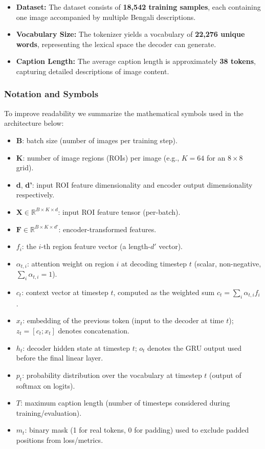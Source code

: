 \begin{itemize}
    \item \textbf{Dataset:} The dataset consists of \textbf{18,542 training samples}, each containing one image accompanied by multiple Bengali descriptions.

    \item \textbf{Vocabulary Size:} The tokenizer yields a vocabulary of \textbf{22,276 unique words}, representing the lexical space the decoder can generate.

    \item \textbf{Caption Length:} The average caption length is approximately \textbf{38 tokens}, capturing detailed descriptions of image content.
\end{itemize}

\subsubsection{Notation and Symbols}
\label{sec:notation}
To improve readability we summarize the mathematical symbols used in the architecture below:
\begin{itemize}
    \item \textbf{B}: batch size (number of images per training step).
    \item \textbf{K}: number of image regions (ROIs) per image (e.g., $K=64$ for an $8\times 8$ grid).
    \item \textbf{d}, \textbf{d'}: input ROI feature dimensionality and encoder output dimensionality respectively.
    \item $\mathbf{X} \in \mathbb{R}^{B\times K\times d}$: input ROI feature tensor (per-batch).
    \item $\mathbf{F} \in \mathbb{R}^{B\times K\times d'}$: encoder-transformed features.
    \item $f_i$: the $i$-th region feature vector (a length-$d'$ vector).
    \item $\alpha_{t,i}$: attention weight on region $i$ at decoding timestep $t$ (scalar, non-negative, \(\sum_i\alpha_{t,i}=1\)).
    \item $c_t$: context vector at timestep $t$, computed as the weighted sum $c_t=\sum_i\alpha_{t,i} f_i$.
    \item $x_t$: embedding of the previous token (input to the decoder at time $t$); $z_t=[c_t; x_t]$ denotes concatenation.
    \item $h_t$: decoder hidden state at timestep $t$; $o_t$ denotes the GRU output used before the final linear layer.
    \item $p_t$: probability distribution over the vocabulary at timestep $t$ (output of softmax on logits).
    \item $T$: maximum caption length (number of timesteps considered during training/evaluation).
    \item $m_t$: binary mask (1 for real tokens, 0 for padding) used to exclude padded positions from loss/metrics.
\end{itemize}

